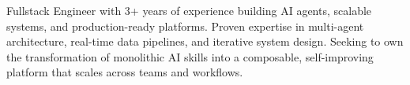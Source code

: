 \documentclass[letter,10pt]{article}
\begin{document}
Fullstack Engineer with 3+ years of experience building AI agents, scalable systems, and production-ready platforms. Proven expertise in multi-agent architecture, real-time data pipelines, and iterative system design. Seeking to own the transformation of monolithic AI skills into a composable, self-improving platform that scales across teams and workflows.
\end{document}
